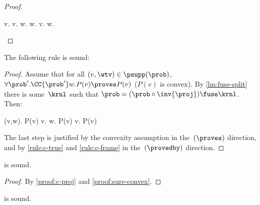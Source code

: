 \begin{proof}
  \begin{eqexplain}
    \CMod{\prob} v. 
    \whichproves*
    \CMod{\mu} v.   w. 
    \whichproves
     w. \CMod{\mu} v.  
    \whichproves
     w.  
    \whichproves
  \end{eqexplain}
\end{proof}
 \begin{lemma}
\label{proof:c-proj}
  The following rule is sound:
  \begin{proofrule}
  \end{proofrule}
\end{lemma}
\begin{proof}
  Assume that for all $(v,\wtv)\in\psupp(\prob)$,
  $\forall \prob'. \CC{\prob'} w. P(v) \proves P(v)$
  (\ie $P(v)$ is convex).
  By \cref{lm:fuse-split} there is some~$\krnl$ such that
  $ \prob=(\prob\circ\inv{\proj})\fuse\krnl $.
  Then:
  \begin{eqexplain}
    \CC \prob (v,w). P(v)
    \whichisequiv*
    \CC {\prob\circ\inv{\proj}} v.
     w. P(v)
    \whichisequiv
    \CC {\prob\circ\inv{\proj}} v. P(v)
  \end{eqexplain}
  The last step is justified by the convexity assumption in the~$(\proves)$
  direction,
  and by \ref{rule:c-true} and \ref{rule:c-frame} in the~$(\provedby)$ direction.
\end{proof}



\begin{lemma}
\label{proof:c-sure-proj}
   is sound.
\end{lemma}
\begin{proof}
  By \cref{proof:c-proj} and \cref{proof:sure-convex}.
\end{proof}
 \begin{lemma}
\label{proof:c-sure-proj-many}
   is sound.
\end{lemma}

